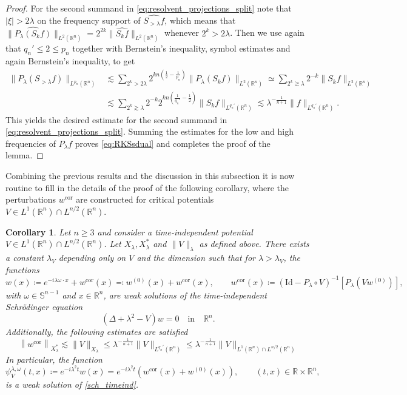 \documentclass[11pt,a4paper]{amsart}
\newtheorem{corollary}[proposition]{Corollary}
\theoremstyle{remark}
\theoremstyle{definition}
\newcommand{\R}{\mathbb{R}}
\def\lec{\lesssim}
\def\wh{\widehat}
\begin{document}
\begin{proof}
For the second summand in \eqref{eq:resolvent_projections_split} note that $|\xi|>2\lambda$ on the frequency support of $\wh{S_{>\lambda} f}$, which means that
$ \| \widehat{P_\lambda(S_k f)} \|_{L^2(\R^n)} = 2^{2k} \| \widehat{S_k f} \|_{L^2(\R^n)}$
whenever $2^k > 2 \lambda$. Then we use again that $q_n ' \leq 2 \leq p_n$ together with Bernstein's inequality, symbol estimates and again Bernstein's inequality, to get  
\[
\begin{split}
 \| P_\lambda (S_{>\lambda} f) \|_{L^{p_n}(\R^n)} &\lec \sum_{2^k > 2 \lambda} 2^{kn(\frac{1}{2} - \frac{1}{p_n})}      \| P_\lambda(S_k f) \|_{L^2(\R^n)} 
\simeq \sum_{ 2^k\gtrsim \lambda} 2^{-k} \| S_k f \|_{L^2(\R^n)} 
\\
&\lec \sum_{2^k \gtrsim \lambda} 2^{-k} 2^{kn(\frac{1}{q_n'} - \frac{1}{2})}  \| S_k f \|_{L^{q_n'}(\R^n)}
\lesssim \lambda^{-\frac{1}{n+1}} \| f \|_{L^{q_n'}(\R^n)}.
\end{split}
\]
This yields the desired estimate for the second summand in \eqref{eq:resolvent_projections_split}. Summing the estimates for the low and high frequencies of $P_\lambda f$ proves \eqref{eq:RKSsdual} and completes the proof of the lemma.
\end{proof}

Combining the previous results and the discussion in this subsection it is now routine to fill in the details of the proof of the following corollary, where the perturbations $w^{\mathrm{cor}}$ are constructed for critical potentials $V\in L^1(\R^n)\cap L^{n/2}(\R^n)$.


\begin{corollary}\label{cor:solutionsVcrit}\sl Let $n\geq 3$ and consider a time-independent potential $V\in L^1(\R^n)\cap L^{n/2}(\R^n)$.  Let $X_\lambda,X_\lambda ^*$ and $\|V\|_\lambda$ as defined above. There exists a constant $\lambda_V$ depending only on $V$ and the dimension such that for $\lambda > \lambda_V$, the functions
\[
w(x)\coloneqq e^{-i\lambda\omega\cdot x} +w^{\mathrm{cor}} (x)\eqqcolon w^{(0)}(x)+w^{\mathrm{cor}}(x),\qquad w^{\mathrm{cor}}(x)\coloneqq (\mathrm{Id}-P_\lambda\circ V)^{-1}[P_\lambda(Vw^{(0)})],
\]
with $\omega\in\mathbb S^{n-1} $ and $ x\in\R^n$,
are weak solutions of the time-independent Schr\"odinger equation 
\[
(\Delta+\lambda^2-V)w=0\quad\mathrm{in}\quad\R^n.
\]
Additionally, the following estimates are satisfied
\[
\left\|w^{\mathrm{cor}} \right\|_{X_\lambda ^*}\lesssim \|V\|_{X_\lambda}\leq \lambda^{-\frac{1}{n+1}} \|V\|_{L^{q_n '}(\R^n)}\leq  \lambda^{-\frac{1}{n+1}} \|V\|_{L^1(\R^n)\cap L^{n/2}(\R^n)}
\]
In particular, the function 
\[
\psi_V ^{\lambda,\omega}(t,x)\coloneqq e^{-i\lambda^2 t}w(x)= e^{-i\lambda^2 t}(w^{\mathrm{cor}}(x)+w^{(0)}(x)),\qquad (t,x)\in\R\times \R^n,
\]
is a weak solution of \eqref{sch_timeind}.
\end{corollary}
\end{document}
